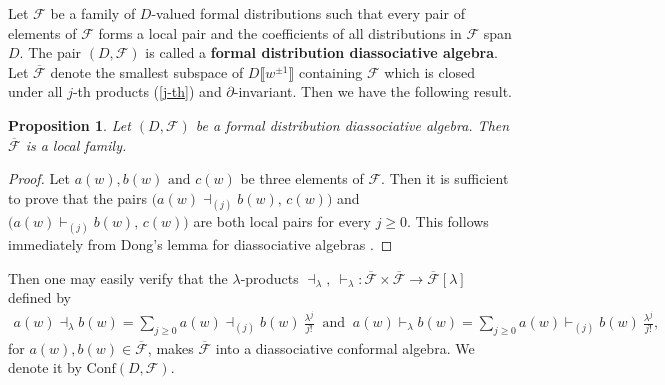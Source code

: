\documentclass[a4paper,reqno,10pt]{amsart}
\theoremstyle{plain}
\newtheorem{proposition}[thm]{Proposition}
\theoremstyle{definition}
\theoremstyle{remark}
\newcommand{\p}{\partial}
\newcommand{\la}{\lambda}
\begin{document}
Let $\mathcal{F}$ be a family of $D$-valued formal distributions such that every pair of elements of $\mathcal{F}$ forms a local pair and the coefficients of all distributions in $\mathcal{F}$ span $D$. The pair $(D,\mathcal{F})$ is called a {\bf formal distribution diassociative algebra}. Let $\overline{\mathcal{F}}$ denote the smallest subspace of $D \llbracket w^{\pm 1 }\rrbracket$ containing $\mathcal{F}$ which is closed under all $j$-th products (\ref{j-th}) and $\p$-invariant. Then we have the following result.
\begin{proposition}
    Let $(D,\mathcal{F})$ be a formal distribution diassociative algebra. Then $\overline{\mathcal{F}}$ is a local family.
\end{proposition}
\begin{proof}
    Let $a(w), b(w) \text{ and } c(w)$ be three elements of $\mathcal{F}$. Then it is sufficient to prove that the pairs $\big( a(w)\dashv_{(j)}b(w),\,c(w) \big)$ and $\big( a(w)\vdash_{(j)}b(w),\,c(w) \big)$ are both local pairs for every $j \geq 0$. This follows immediately from Dong's lemma for diassociative algebras \cite{koli-Sart}.
\end{proof}
Then one may easily verify that the $\la$-products $\dashv_\la, ~ \! \vdash_\la: \overline{\mathcal{F}} \times \overline{\mathcal{F}} \to \overline{\mathcal{F}}[\la]$ defined by 
\begin{align*}
    a(w) \dashv_\la b(w) = \sum_{j \geq 0} a(w) \dashv_{(j)} b(w) ~ \! \frac{\la^j}{j!} ~\text{ and }~  a(w) \vdash_\la b(w) = \sum_{j \geq 0} a(w) \vdash_{(j)} b(w) ~ \! \frac{\la^j}{j!}, 
\end{align*}
for $a(w),b(w) \in \overline{\mathcal{F}}$, makes $\overline{\mathcal{F}}$ into a diassociative conformal algebra. We denote it by $\text{Conf}(D, \mathcal{F})$.

\medskip
\end{document}
